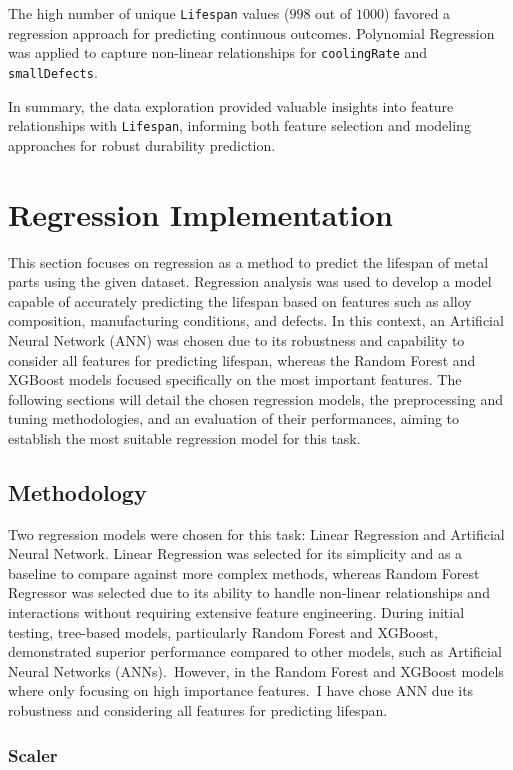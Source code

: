 \documentclass{article}
\begin{document}
The high number of unique \texttt{Lifespan} values ($998$ out of $1000$) favored a regression approach for predicting continuous outcomes. Polynomial Regression was applied to capture non-linear relationships for \texttt{coolingRate} and \texttt{smallDefects}.

In summary, the data exploration provided valuable insights into feature relationships with \texttt{Lifespan}, informing both feature selection and modeling approaches for robust durability prediction.

\section{Regression Implementation}

This section focuses on regression as a method to predict the lifespan of metal parts using the given dataset. Regression analysis was used to develop a model capable of accurately predicting the lifespan based on features such as alloy composition, manufacturing conditions, and defects. In this context, an Artificial Neural Network (ANN) was chosen due to its robustness and capability to consider all features for predicting lifespan, whereas the Random Forest and XGBoost models focused specifically on the most important features. The following sections will detail the chosen regression models, the preprocessing and tuning methodologies, and an evaluation of their performances, aiming to establish the most suitable regression model for this task.

\subsection{Methodology}

Two regression models were chosen for this task: Linear Regression and Artificial Neural Network. Linear Regression was selected for its simplicity and as a baseline to compare against more complex methods, whereas Random Forest Regressor was selected due to its ability to handle non-linear relationships and interactions without requiring extensive feature engineering. During initial testing, tree-based models, particularly Random Forest and XGBoost, demonstrated superior performance compared to other models, such as Artificial Neural Networks (ANNs). However, in the Random Forest and XGBoost models where only focusing on high importance features. I have chose ANN due its robustness and considering all features for predicting lifespan.

\subsubsection{Scaler}
\end{document}
